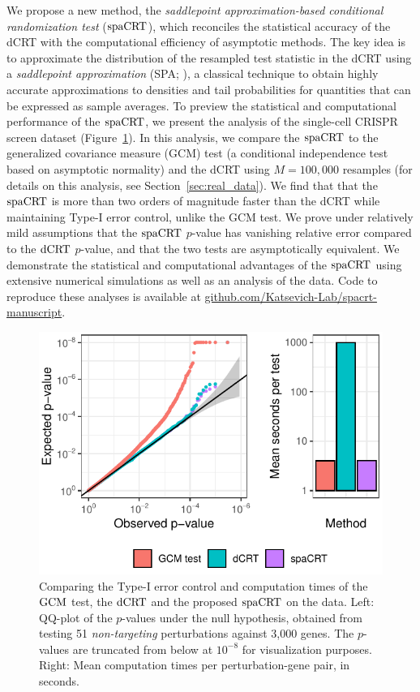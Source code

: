 \documentclass[12pt]{article}
\theoremstyle{definition}
\newcommand{\dCRT}{\textnormal{dCRT}} 					%
\newcommand{\GCM}{\textnormal{GCM}}						%
\newcommand{\spacrt}{\textnormal{spaCRT}}               %
\begin{document}
We propose a new method, the \textit{saddlepoint approximation-based conditional randomization test} ($\spacrt$), which reconciles the statistical accuracy of the dCRT with the computational efficiency of asymptotic methods. The key idea is to approximate the distribution of the resampled test statistic in the dCRT using a \textit{saddlepoint approximation} (SPA; \cite{Daniels1954,Lugannani1980}), a classical technique to obtain highly accurate approximations to densities and tail probabilities for quantities that can be expressed as sample averages. To preview the statistical and computational performance of the $\spacrt$, we present the analysis of the \citet{Gasperini2019a} single-cell CRISPR screen dataset (Figure~\ref{fig:dCRT_GCM_binomial_poisson}). In this analysis, we compare the $\spacrt$ to the generalized covariance measure (GCM) test \citep{Shah2018} (a conditional independence test based on asymptotic normality) and the dCRT using $M = 100,000$ resamples (for details on this analysis, see Section~\ref{sec:real_data}). We find that that the $\spacrt$ is more than two orders of magnitude faster than the dCRT while maintaining Type-I error control, unlike the GCM test. We prove under relatively mild assumptions that the $\spacrt$ $p$-value has vanishing relative error compared to the $\dCRT$ $p$-value, and that the two tests are asymptotically equivalent. We demonstrate the statistical and computational advantages of the $\spacrt$ using extensive numerical simulations as well as an analysis of the \citet{Gasperini2019a} data. Code to reproduce these analyses is available at \href{https://github.com/Katsevich-Lab/spacrt-manuscript}{github.com/Katsevich-Lab/spacrt-manuscript}. 

\begin{figure}[h!]
	\centering
	\includegraphics{figures-and-tables/motivating_example.pdf} 
	\caption{Comparing the Type-I error control and computation times of the $\GCM$ test, the $\dCRT$ and the proposed $\spacrt$ on the \citet{Gasperini2019a} data. Left: QQ-plot of the $p$-values under the null hypothesis, obtained from testing 51 \textit{non-targeting} perturbations against 3,000 genes. The $p$-values are truncated from below at $10^{-8}$ for visualization purposes. Right: Mean computation times per perturbation-gene pair, in seconds.}
	\label{fig:dCRT_GCM_binomial_poisson} 
\end{figure}
\end{document}
